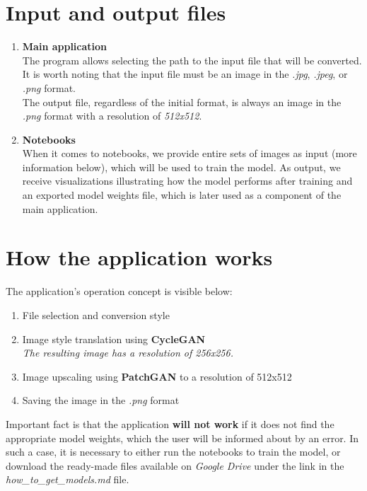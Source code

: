 \documentclass{article}
\begin{document}
\section{Input and output files}
\begin{enumerate}[label=\arabic*.]
    \item \textbf{Main application} \\
The program allows selecting the path to the input file that will be converted. It is worth noting that the input file must be an image in the \textit{.jpg}, \textit{.jpeg}, or \textit{.png} format.
\vspace{3mm} \\
The output file, regardless of the initial format, is always an image in the \textit{.png} format with a resolution of \textit{512x512}.
    \item \textbf{Notebooks} \\
When it comes to notebooks, we provide entire sets of images as input (more information below), which will be used to train the model. As output, we receive visualizations illustrating how the model performs after training and an exported model weights file, which is later used as a component of the main application.
\end{enumerate}

\section{How the application works}
The application's operation concept is visible below:
\begin{enumerate}[label=\arabic*.]
    \item File selection and conversion style
    \item Image style translation using \textbf{CycleGAN} \\
\textit{The resulting image has a resolution of 256x256.}
    \item Image upscaling using \textbf{PatchGAN} to a resolution of 512x512
    \item Saving the image in the \textit{.png} format
\end{enumerate}
Important fact is that the application \textbf{will not work} if it does not find the appropriate model weights, which the user will be informed about by an error.
In such a case, it is necessary to either run the notebooks to train the model, or download the ready-made files available on \textit{Google Drive} under the link in the \textit{how\_to\_get\_models.md} file.
\end{document}
